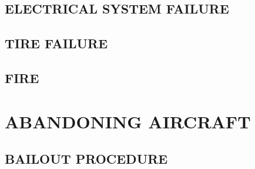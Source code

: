 \subsection{ELECTRICAL SYSTEM FAILURE}
\subsection{TIRE FAILURE}
\subsection{FIRE}


\section{ABANDONING AIRCRAFT}
\subsection{BAILOUT PROCEDURE}


\cleardoublepage{}